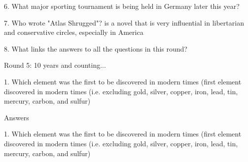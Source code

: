 \begin{frame}
\begin{center}
\Large
6. What major sporting tournament is being held in Germany later this year?
\\
\end{center}
\end{frame}
\begin{frame}
\begin{center}
\Large
7. Who wrote "Atlas Shrugged"? is a novel that is very influential in libertarian and conservative circles, especially in America
\\
\end{center}
\end{frame}
\begin{frame}
\begin{center}
\Large
8. What links the answers to all the questions in this round?
\\
\end{center}
\end{frame}
\begin{frame}
\begin{center}
\Huge
Round 5: 10 years and counting...
\end{center}
\end{frame}
\begin{frame}
\begin{center}
\Large
1. Which element was the first to be discovered in modern times (first element discovered in modern times (i.e. excluding gold, silver, copper, iron, lead, tin, mercury, carbon, and sulfur)
\end{center}
\end{frame}
\begin{frame}
\begin{center}
\Huge
Answers
\end{center}
\end{frame}
\begin{frame}
\begin{center}
\Large
1. Which element was the first to be discovered in modern times (first element discovered in modern times (i.e. excluding gold, silver, copper, iron, lead, tin, mercury, carbon, and sulfur)
\\
\end{center}
\end{frame}
